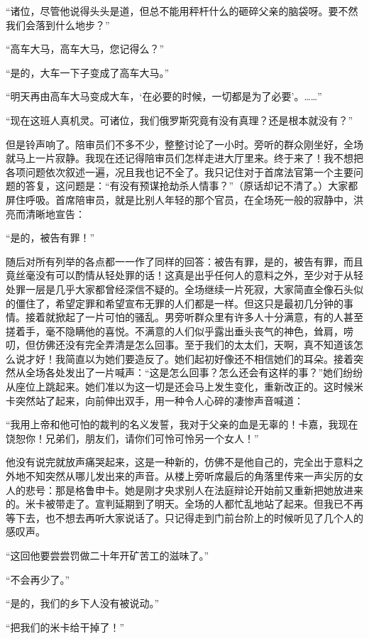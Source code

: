 \par “诸位，尽管他说得头头是道，但总不能用秤杆什么的砸碎父亲的脑袋呀。要不然我们会落到什么地步？”
\par “高车大马，高车大马，您记得么？”
\par “是的，大车一下子变成了高车大马。”
\par “明天再由高车大马变成大车，‘在必要的时候，一切都是为了必要’。……”
\par “现在这班人真机灵。可诸位，我们俄罗斯究竟有没有真理？还是根本就没有？”
\par 但是铃声响了。陪审员们不多不少，整整讨论了一小时。旁听的群众刚坐好，全场就马上一片寂静。我现在还记得陪审员们怎样走进大厅里来。终于来了！我不想把各项问题依次叙述一遍，况且我也记不全了。我只记住对于首席法官第一个主要问题的答复，这问题是：“有没有预谋抢劫杀人情事？”（原话却记不清了。）大家都屏住呼吸。首席陪审员，就是比别人年轻的那个官员，在全场死一般的寂静中，洪亮而清晰地宣告：
\par “是的，被告有罪！”
\par 随后对所有列举的各点都一一作了同样的回答：被告有罪，是的，被告有罪，而且竟丝毫没有可以酌情从轻处罪的话！这真是出乎任何人的意料之外，至少对于从轻处罪一层是几乎大家都曾经深信不疑的。全场继续一片死寂，大家简直全像石头似的僵住了，希望定罪和希望宣布无罪的人们都是一样。但这只是最初几分钟的事情。接着就掀起了一片可怕的骚乱。男旁听群众里有许多人十分满意，有的人甚至搓着手，毫不隐瞒他的喜悦。不满意的人们似乎露出垂头丧气的神色，耸肩，唠叨，但仿佛还没有完全弄清是怎么回事。至于我们的太太们，天啊，真不知道该怎么说才好！我简直以为她们要造反了。她们起初好像还不相信她们的耳朵。接着突然从全场各处发出了一片喊声：“这是怎么回事？怎么还会有这样的事？”她们纷纷从座位上跳起来。她们准以为这一切是还会马上发生变化，重新改正的。这时候米卡突然站了起来，向前伸出双手，用一种令人心碎的凄惨声音喊道：
\par “我用上帝和他可怕的裁判的名义发誓，我对于父亲的血是无辜的！卡嘉，我现在饶恕你！兄弟们，朋友们，请你们可怜可怜另一个女人！”
\par 他没有说完就放声痛哭起来，这是一种新的，仿佛不是他自己的，完全出于意料之外地不知突然从哪儿发出来的声音。从楼上旁听席最后的角落里传来一声尖厉的女人的悲号：那是格鲁申卡。她是刚才央求别人在法庭辩论开始前又重新把她放进来的。米卡被带走了。宣判延期到了明天。全场的人都忙乱地站了起来。但我已不再等下去，也不想去再听大家说话了。只记得走到门前台阶上的时候听见了几个人的感叹声。
\par “这回他要尝尝罚做二十年开矿苦工的滋味了。”
\par “不会再少了。”
\par “是的，我们的乡下人没有被说动。”
\par “把我们的米卡给干掉了！”


